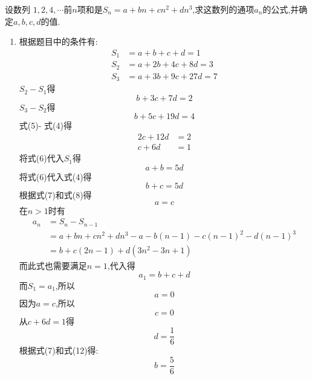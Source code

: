 \begin{questions}
	\question[8] 设数列 $1,2,4, \cdots$前$n$项和是$S_n = a + bn + cn^2 +
		dn^3$,求这数列的通项$a_n$的公式,并确定$a,b,c,d$的值.
	\begin{solution}
		\begin{enumerate}[label=\protect\circled{\arabic*}]
			\item 根据题目中的条件有:
			      \begin{align}
				      S_1 & = a + b + c + d      = 1 \\
				      S_2 & = a + 2b + 4c + 8d   = 3 \\
				      S_3 & = a + 3b + 9c + 27d  = 7
			      \end{align}
			      $S_2 - S_1$得
			      \begin{equation}
				      b + 3c + 7d =2
			      \end{equation}
			      $S_3 - S_2$得
			      \begin{equation}
				      b + 5c + 19d = 4
			      \end{equation}
			      式(5)- 式(4)得
			      \begin{align}
				      2c + 12d & = 2 \nonumber \\
				      c + 6d   & = 1
			      \end{align}
			      将式(6)代入$S_1$得
			      \begin{equation}
				      a+b = 5d
			      \end{equation}
			      将式(6)代入式(4)得
			      \begin{equation}
				      b+c = 5d
			      \end{equation}
			      根据式(7)和式(8)得
			      \begin{equation}
				      a = c
				      \label{eq:a=c}
			      \end{equation}
			      在$n>1$时有
			      \begin{align}
				      a_n & = S_n - S_{n-1} \nonumber                                           \\
				          & = a + bn + cn^2 + dn^3 - a - b(n-1) - c(n-1)^2 - d(n-1)^3 \nonumber \\
				          & = b + c(2n-1) + d(3n^2 - 3n + 1)
			      \end{align}
			      而此式也需要满足$n=1$,代入得
			      \begin{equation}
				      a_1 = b+c+d
			      \end{equation}
			      而$S_1= a_1$,所以
			      \begin{equation}
				      a= 0
			      \end{equation}
			      因为$a=c$,所以
			      \begin{equation}
				      c = 0
			      \end{equation}
			      从$c+6d=1$得
			      \begin{equation}
				      d = \frac16
			      \end{equation}
			      根据式(7)和式(12)得:
			      \begin{equation}
				      b = \frac56
			      \end{equation}


\end{enumerate}
\end{solution}
\end{questions}
